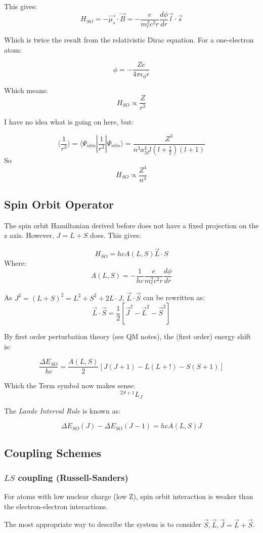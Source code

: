 \documentclass[12pt]{article}
\begin{document}
This gives:
\[H_{SO} = -\vec{\mu_s}\cdot\vec{B} = -\frac{e}{m^2_ec^2 r}\frac{d\phi}{dr}{\vec{l}\cdot \vec{s}}\]

Which is twice the result from the relativistic Dirac equation. For a one-electron atom:

\[\phi = -\frac{Ze}{4\pi\epsilon_0 r}\]

Which means:
\[H_{SO} \propto \frac{Z}{r^3}\]

I have no idea what is going on here, but:

\[ \langle \frac{1}{r^3} \rangle = \langle \Psi_{nlm} | \frac1{r^3} |\Psi_{nlm}\rangle = \frac{Z^3}{n^3a^3_Ml(l+\frac12)(l+1)}\]
So
\[H_{SO} \propto \frac{Z^4}{n^3}\]

\subsection{Spin Orbit Operator}
The spin orbit Hamiltonian derived before does not have a fixed projection on the z axis. However, $J=L+S$ does. This gives:

\[H_{SO} = hc A(L,S) \vec{L} \cdot {S}\]
Where:
\[A(L,S) = -\frac{1}{hc}\frac{e}{m^2_ec^2 r}\frac{d\phi}{dr}\]

As $J^2 = (L+S)^2 = L^2+S^2+2L\cdot J$, $\vec{L}\cdot\vec{S}$ can be rewritten as:
\[ \vec{L}\cdot\vec{S} = \frac12 [\vec{J}^2 - \vec{L}^2 - \vec{S}^2]\]

By first order perturbation theory (see QM notes), the (first order) energy shift is:

\[\frac{\Delta E_{SO}}{hc} = \frac{A(L,S)}{2}[J(J+1) - L(L+!) - S(S+1)]\]

Which the Term symbol now makes sense:
\[ ^{2S+1}L_J\]

The \textit{Lande Interval Rule} is known as:

\[\Delta E_{SO}(J) - \Delta E_{SO}(J-1) = hc A(L,S) J\]

\subsection{Coupling Schemes}
\subsubsection{$LS$ coupling (Russell-Sanders)}

For atoms with low nuclear charge (low Z), spin orbit interaction is weaker than the electron-electron interactions.

The most appropriate way to describe the system is to consider $\vec{S}, \vec{L}, \vec{J} = \vec{L}+\vec{S}$.  
\end{document}
